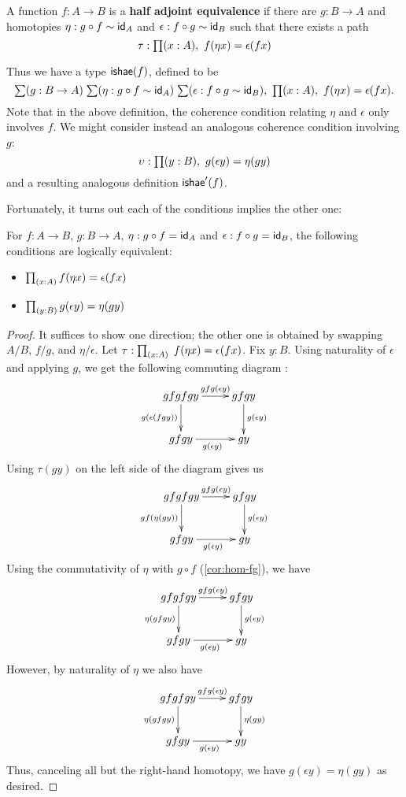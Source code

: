 \begin{defn}
  A function $f:A\to B$ is a \textbf{half adjoint equivalence} if there are $g:B\to A$ and homotopies $\eta: g \circ f \sim \idfunc[A]$ and $\epsilon:f \circ g \sim \idfunc[B]$ such that there exists a path
  \[\tau : \prd{x:A} \map{f}{\eta x} = \epsilon(fx)\]
\end{defn}

Thus we have a type $\ishae(f)$, defined to be
\begin{equation*}
  \sm{g:B\to A}{\eta: g \circ f \sim \idfunc[A]}{\epsilon:f \circ g \sim \idfunc[B]} \prd{x:A} \map{f}{\eta x} = \epsilon(fx).
\end{equation*}
Note that in the above definition, the coherence condition relating $\eta$ and $\epsilon$ only involves $f$.
We might consider instead an analogous coherence condition involving $g$:
\[\upsilon : \prd{y:B} \map{g}{\epsilon y} = \eta(gy)\]
and a resulting analogous definition $\ishae'(f)$.

Fortunately, it turns out each of the conditions implies the other one:

\begin{lem}\label{lem:coh-equiv}
For $f : A \to B$, $g:B\to A$, $\eta: g \circ f = \idfunc[A]$ and $\epsilon:f \circ g = \idfunc[B]$, the following conditions are logically equivalent:
\begin{itemize}
\item $\prd{x:A} \map{f}{\eta x} = \epsilon(fx)$
\item $\prd{y:B} \map{g}{\epsilon y} = \eta(gy)$
\end{itemize}
\end{lem}
\begin{proof}
  It suffices to show one direction; the other one is obtained by swapping $A/B$, $f/g$, and $\eta/\epsilon$.
  Let $\tau : \prd{x:A}\;\map{f}{\eta x} = \epsilon(fx)$.
  Fix $y : B$.
  Using naturality of $\epsilon$ and applying $g$, we get the following commuting diagram :
\[\uppercurveobject{{ }}\lowercurveobject{{ }}\twocellhead{{ }}
  \xymatrix{gfgfgy \ar^-{gfg(\epsilon y)}[r] \ar_{g(\epsilon (fgy))}[d] & gfgy \ar^{g(\epsilon y)}[d] \\ gfgy \ar_{g(\epsilon y)}[r] & gy
  }\]
Using $\tau(gy)$ on the left side of the diagram gives us
\[\uppercurveobject{{ }}\lowercurveobject{{ }}\twocellhead{{ }}
  \xymatrix{gfgfgy \ar^-{gfg(\epsilon y)}[r] \ar_{gf(\eta (gy))}[d] & gfgy \ar^{g(\epsilon y)}[d] \\ gfgy \ar_{g(\epsilon y)}[r] & gy
  }\]
Using the commutativity of $\eta$ with $g \circ f$ (\autoref{cor:hom-fg}), we have
\[\uppercurveobject{{ }}\lowercurveobject{{ }}\twocellhead{{ }}
  \xymatrix{gfgfgy \ar^-{gfg(\epsilon y)}[r] \ar_{\eta (gfgy)}[d] & gfgy \ar^{g(\epsilon y)}[d] \\ gfgy \ar_{g(\epsilon y)}[r] & gy
  }\]
However, by naturality of $\eta$ we also have
\[\uppercurveobject{{ }}\lowercurveobject{{ }}\twocellhead{{ }}
  \xymatrix{gfgfgy \ar^-{gfg(\epsilon y)}[r] \ar_{\eta (gfgy)}[d] & gfgy \ar^{\eta(gy)}[d] \\ gfgy \ar_{g(\epsilon y)}[r] & gy 
  }\]
Thus, canceling all but the right-hand homotopy, we have $g(\epsilon y) = \eta(g y)$ as desired.
\end{proof}

